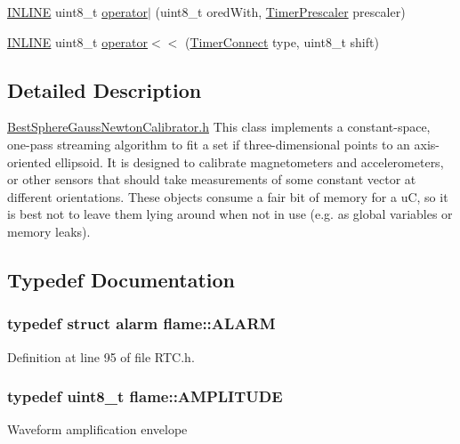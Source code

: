 \begin{DoxyCompactItemize}
\item 
\hyperlink{io_8h_a2eb6f9e0395b47b8d5e3eeae4fe0c116}{I\-N\-L\-I\-N\-E} uint8\-\_\-t \hyperlink{namespaceflame_aa1319586e85825579a43f71b68e27eaf}{operator$\vert$} (uint8\-\_\-t ored\-With, \hyperlink{namespaceflame_a24dfd057ba5ab5a827abbc4ed902a087}{Timer\-Prescaler} prescaler)
\item 
\hyperlink{io_8h_a2eb6f9e0395b47b8d5e3eeae4fe0c116}{I\-N\-L\-I\-N\-E} uint8\-\_\-t \hyperlink{namespaceflame_a14ec67a99d9c07ff8a555e25514ef983}{operator$<$$<$} (\hyperlink{namespaceflame_ae65577f52d5a5d4ce0cc5a4b85fb9ba9}{Timer\-Connect} type, uint8\-\_\-t shift)
\end{DoxyCompactItemize}


\subsection{Detailed Description}
\hyperlink{_best_sphere_gauss_newton_calibrator_8h}{Best\-Sphere\-Gauss\-Newton\-Calibrator.\-h} This class implements a constant-\/space, one-\/pass streaming algorithm to fit a set if three-\/dimensional points to an axis-\/oriented ellipsoid. It is designed to calibrate magnetometers and accelerometers, or other sensors that should take measurements of some constant vector at different orientations. These objects consume a fair bit of memory for a u\-C, so it is best not to leave them lying around when not in use (e.\-g. as global variables or memory leaks). 

\subsection{Typedef Documentation}
\hypertarget{namespaceflame_a7a5a7b0bdd1b44d7d0b0a600552b5ab5}{
\subsubsection[{A\-L\-A\-R\-M}]{\setlength{\rightskip}{0pt plus 5cm}typedef struct {\bf alarm} {\bf flame\-::\-A\-L\-A\-R\-M}}}\label{namespaceflame_a7a5a7b0bdd1b44d7d0b0a600552b5ab5}


Definition at line 95 of file R\-T\-C.\-h.

\hypertarget{namespaceflame_a7f6447252c60127b805475b293831f99}{
\subsubsection[{A\-M\-P\-L\-I\-T\-U\-D\-E}]{\setlength{\rightskip}{0pt plus 5cm}typedef uint8\-\_\-t {\bf flame\-::\-A\-M\-P\-L\-I\-T\-U\-D\-E}}}\label{namespaceflame_a7f6447252c60127b805475b293831f99}
Waveform amplification envelope

